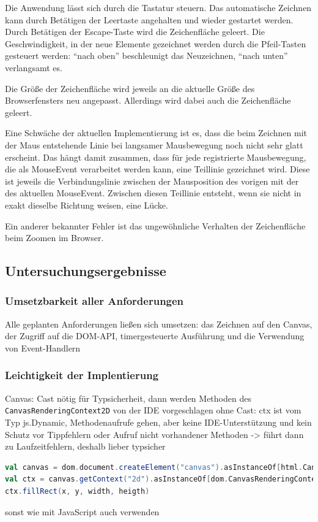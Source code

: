 \documentclass[a4paper, 12pt, hidelinks, listof=totoc, listoftables=totoc, bibliography=totoc]{scrreprt}
\begin{document}
Die Anwendung lässt sich durch die Tastatur steuern. Das automatische Zeichnen kann durch Betätigen der Leertaste angehalten und wieder gestartet werden. Durch Betätigen der Escape-Taste wird die Zeichenfläche geleert. Die Geschwindigkeit, in der neue Elemente gezeichnet werden durch die Pfeil-Tasten gesteuert werden: "`nach oben"' beschleunigt das Neuzeichnen, "`nach unten"' verlangsamt es.

Die Größe der Zeichenfläche wird jeweils an die aktuelle Größe des Browserfensters neu angepasst. Allerdings wird dabei auch die Zeichenfläche geleert.

Eine Schwäche der aktuellen Implementierung ist es, dass die beim Zeichnen mit der Maus entstehende Linie bei langsamer Mausbewegung noch nicht sehr glatt erscheint. Das hängt damit zusammen, dass für jede registrierte Mausbewegung, die als MouseEvent verarbeitet werden kann, eine Teillinie gezeichnet wird. Diese ist jeweils die Verbindungslinie zwischen der Mausposition des vorigen mit der des aktuellen MouseEvent. Zwischen diesen Teillinie entsteht, wenn sie nicht in exakt dieselbe Richtung weisen, eine Lücke.

Ein anderer bekannter Fehler ist das ungewöhnliche Verhalten der Zeichenfläche beim Zoomen im Browser.


\subsection{Untersuchungsergebnisse}

\subsubsection{Umsetzbarkeit aller Anforderungen}

Alle geplanten Anforderungen ließen sich umsetzen: das Zeichnen auf den Canvas, der Zugriff auf die DOM-API, timergesteuerte Ausführung und die Verwendung von Event-Handlern


\subsubsection{Leichtigkeit der Implentierung}

Canvas:
	Cast nötig für Typsicherheit, dann werden Methoden des \texttt{CanvasRenderingContext2D} von der IDE vorgeschlagen
	ohne Cast: ctx ist vom Typ js.Dynamic, Methodenaufrufe gehen, aber keine IDE-Unterstützung und kein Schutz vor Tippfehlern oder Aufruf nicht vorhandener Methoden -> führt dann zu Laufzeitfehlern, deshalb lieber typsicher
\begin{lstlisting}[language=Scala]
val canvas = dom.document.createElement("canvas").asInstanceOf[html.Canvas]
val ctx = canvas.getContext("2d").asInstanceOf[dom.CanvasRenderingContext2D]
ctx.fillRect(x, y, width, heigth)
\end{lstlisting}
	sonst wie mit JavaScript auch verwenden
	
\end{document}

